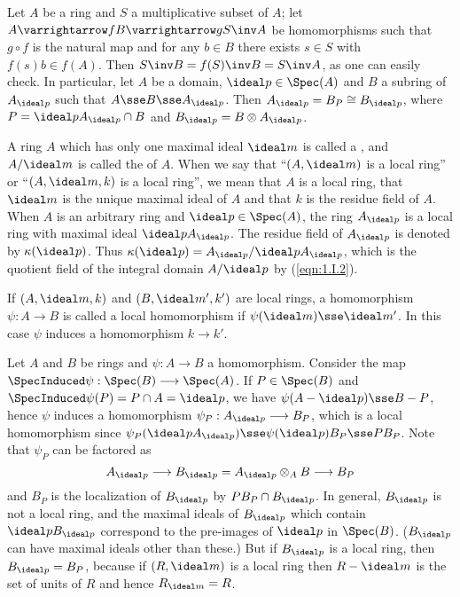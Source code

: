\documentclass[../main]{subfiles}
\begin{document}
\newparagraph
Let $A$ be a ring and $S$ a multiplicative subset of $A$; let $A \varrightarrow fB\varrightarrow gS\inv A$ be homomorphisms such that $g\circ f$ is the natural map and for any $b\in B$ there exists $s\in S$ with $f(s)b\in f(A)$. Then $S\inv B=f(S)\inv B=S\inv A$, as one can easily check. In particular, let $A$ be a domain, $\ideal p\in\Spec(A)$ and $B$ a subring of $A_{\ideal p}$ such that $A\sse B\sse A_{\ideal p}$. Then $A_{\ideal p}=B_P\cong B_{\ideal p}$, where $P=\ideal pA_{\ideal p}\cap B$ and $B_{\ideal p}=B\otimes A_{\ideal p}$.

\newparagraph
A ring $A$ which has only one maximal ideal $\ideal m$ is called a , and $A/\ideal m$ is called the  of $A$. When we say that ``$(A,\ideal m)$ is a local ring'' or ``$(A,\ideal m,k)$ is a local ring'', we mean that $A$ is a local ring, that $\ideal m$ is the unique maximal ideal of $A$ and that $k$ is the residue field of $A$. When $A$ is an arbitrary ring and $\ideal p\in\Spec(A)$, the ring $A_{\ideal p}$ is a local ring with maximal ideal $\ideal pA_{\ideal p}$. The residue field of $A_{\ideal p}$ is denoted by $\kappa(\ideal p)$. Thus $\kappa(\ideal p)=A_{\ideal p}/\ideal pA_{\ideal p}$, which is the quotient field of the integral domain $A/\ideal p$ by (\ref{eqn:1.I.2}).

If $(A,\ideal m,k)$ and $(B,\ideal m',k')$ are local rings, a homomorphism $\psi:A\longrightarrow B$ is called a local homomorphism if $\psi(\ideal m)\sse\ideal m'$. In this case $\psi$ induces a homomorphism $k\longrightarrow k'$.

Let $A$ and $B$ be rings and $\psi:A\longrightarrow B$ a homomorphism. Consider the map $\SpecInduced\psi:\Spec(B)\longrightarrow\Spec(A)$. If $P\in\Spec(B)$ and $\SpecInduced\psi(P)=P\cap A=\ideal p$, we have $\psi(A-\ideal p)\sse B-P$, hence $\psi$ induces a homomorphism $\psi_P:A_{\ideal p}\longrightarrow B_P$, which is a local homomorphism since $\psi_P(\ideal pA_{\ideal p})\sse\psi(\ideal p)B_P\sse PB_P$. Note that $\psi_P$ can be factored as \[A_{\ideal p}\longrightarrow B_{\ideal p}=A_{\ideal p}\otimes_AB\longrightarrow B_P\] and $B_P$ is the localization of $B_{\ideal p}$ by $PB_P\cap B_{\ideal p}$. In general, $B_{\ideal p}$ is not a local ring, and the maximal ideals of $B_{\ideal p}$ which contain $\ideal pB_{\ideal p}$ correspond to the pre-images of $\ideal p$ in $\Spec(B)$. ($B_{\ideal p}$ can have maximal ideals other than these.) But if $B_{\ideal p}$ is a local ring, then $B_{\ideal p}=B_P$, because if $(R,\ideal m)$ is a local ring then $R-\ideal m$ is the set of units of $R$ and hence $R_{\ideal m}=R$.
\end{document}
